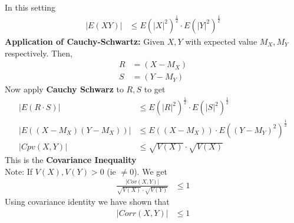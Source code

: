 \documentclass[11pt,oneside]{book}
\theoremstyle{break}
\theoremstyle{break}
\newcommand{\note}{\color{Purple}Note: \color{black}}
\begin{document}
In this setting \begin{align*}
|E(XY)|&\leq E(|X|^2)^{\frac{1}{2}}\cdot E(|Y|^2)^{\frac{1}{2}}
\end{align*}
\textbf{Application of Cauchy-Schwartz:} Given $X,Y$ with expected value $M_X,M_Y$ respectively. Then, \begin{align*}
R&=(X-M_X)\\
S&=(Y-M_Y)
\end{align*}
Now apply \textbf{Cauchy Schwarz} to $R,S$ to get \begin{align*}
|E(R\cdot S)|&\leq E(|R|^2)^{\frac{1}{2}} \cdot E(|S|^2)^{\frac{1}{2}}\\
|E((X-M_X)(Y-M_X))|&\leq E((X-M_X))\cdot E((Y-M_Y)^2)^{\frac{1}{2}}\\
|Cpv(X,Y)|&\leq \sqrt{V(X)}\cdot \sqrt{V(X)}
\end{align*}
This is the \textbf{Covariance Inequality}\\
\note If $V(X),V(Y)>0$ (ie $\neq 0$). We get \begin{align*}
\frac{|Cov(X,Y)|}{\sqrt{V(X)}\cdot \sqrt{V(Y)}}&\leq 1
\end{align*}
Using covariance identity we have shown that \begin{align*}
|Corr(X,Y)|&\leq 1
\end{align*}
\end{document}
